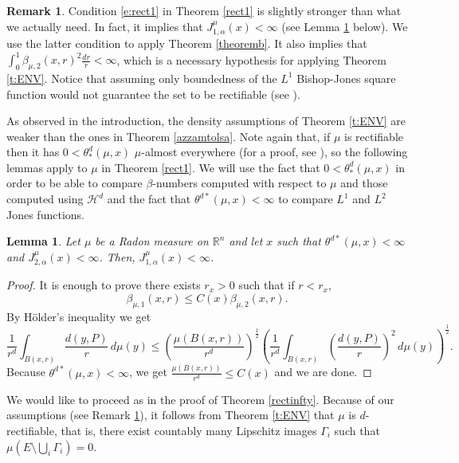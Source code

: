 \documentclass[11pt, twoside, leqno]{article}
\numberwithin{equation}{section}
\theoremstyle{plain}
\newtheorem{lem}[thm]{Lemma}
\theoremstyle{definition}
\newtheorem{rk}[thm]{Remark}
\newcommand{\R}{\mathbb{R}}
\begin{document}
\begin{rk} \label{variousbetas}
Condition \ref{e:rect1} in Theorem \ref{rect1} is slightly stronger than what we actually need. In fact, it implies that $J^{\mu}_{1,\alpha}(x)< \infty$ (see Lemma \ref{2implies1} below). We use the latter condition to apply Theorem \ref{theoremb}. It also implies that $\int_0^1\beta_{\mu,2}(x,r)^2 \frac{dr}{r} < \infty$, which is a necessary hypothesis for applying Theorem \ref{t:ENV}. Notice that assuming only boundedness of the $L^1$ Bishop-Jones square function would not guarantee the set to be rectifiable (see \cite{tolsaarxiv}).


As observed in the introduction, the density assumptions of Theorem \ref{t:ENV} are weaker than the ones in Theorem \ref{azzamtolsa}. Note again that, if $\mu$ is rectifiable then it has $0< \theta_*^d({\mu},x)$ $\mu$-almost everywhere (for a proof, see \cite{raananmatt1}), so the following lemmas apply to $\mu$ in Theorem \ref{rect1}.
We will use the fact that $0< \theta^d_{*}(\mu,x)$ in order to be able to compare $\beta$-numbers computed with respect to $\mu$ and those computed using $\mathcal{H}^d$ and the fact that $\theta^{d *}(\mu,x) < \infty$ to compare $L^1$ and $L^2$ Jones functions.
\end{rk}

\begin{lem} \label{2implies1}
Let $\mu$ be a Radon measure on $\R^n$ and let $x$ such that $\theta^{d *}(\mu,x)<\infty$ and $J^{\mu}_{2,\alpha}(x) < \infty$. Then, $J^{\mu}_{1,\alpha}(x) < \infty$.
\end{lem}
\begin{proof}
It is enough to prove there exists $r_x >0$ such that if $r<r_x$,
\begin{equation}
    \beta_{\mu,1}(x,r) \leq C(x) \beta_{\mu,2}(x,r).
\end{equation}
By H\"{o}lder's inequality we get
\begin{equation}
    \frac{1}{r^d}\int_{B(x,r)}\frac{d(y,P)}{r}\,d\mu(y) \leq \left(\frac{\mu(B(x,r))}{r^d}\right)^{\frac12}\left(\frac{1}{r^d}\int_{B(x,r)}\left(\frac{d(y,P)}{r}\right)^2\,d\mu(y)\right)^{\frac12}.
\end{equation}
Because $\theta^{d *}(\mu,x)<\infty$, we get $\frac{\mu(B(x,r))}{r^d}\leq C(x)$ and we are done.
\end{proof}

We would like to proceed as in the proof of Theorem \ref{rectinfty}. Because of our assumptions (see Remark \ref{variousbetas}), it follows from Theorem \ref{t:ENV} that $\mu$ is $d$-rectifiable, that is, there exist countably many Lipschitz images $\Gamma_i$ such that $\mu\left(E \setminus \bigcup_i \Gamma_i\right)=0$. 
\end{document}
